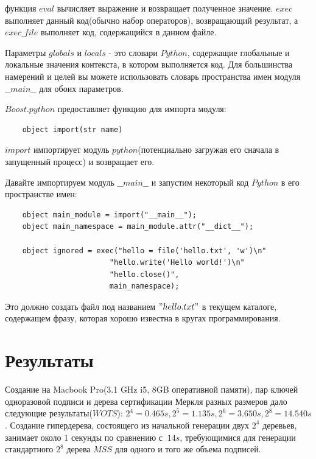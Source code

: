 \documentclass[a4paper, 14pt]{extarticle}
\begin{document}
функция $eval$ вычисляет выражение и возвращает полученное значение. $exec$ выполняет данный код(обычно набор операторов), возвращающий результат, а $exec\_file$ выполняет код, содержащийся в данном файле.

Параметры $globals$ и $locals$ - это словари $Python$, содержащие глобальные и локальные значения контекста, в котором выполняется код. Для большинства намерений и целей вы можете использовать словарь пространства имен модуля $\_\_main\_\_$ для обоих параметров.

$Boost.python$ предоставляет функцию для импорта модуля:
\begin{verbatim}
    object import(str name)
\end{verbatim}

$import$ импортирует модуль $python$(потенциально загружая его сначала в запущенный процесс) и возвращает его.

Давайте импортируем модуль $\_\_main\_\_$ и запустим некоторый код $Python$ в его пространстве имен:

\begin{verbatim}
    object main_module = import("__main__");
    object main_namespace = main_module.attr("__dict__");

    object ignored = exec("hello = file('hello.txt', 'w')\n"
                        "hello.write('Hello world!')\n"
                        "hello.close()",
                        main_namespace);
\end{verbatim}

Это должно создать файл под названием $"hello.txt"$ в текущем каталоге, содержащем фразу, которая хорошо известна в кругах программирования.

\newpage

\section{Результаты}
Создание на Macbook Pro(3.1 GHz i5, 8GB оперативной памяти), пар ключей одноразовой подписи и дерева сертификации Меркля разных размеров дало следующие результаты($WOTS$): $2^4 = 0.465s, 2^5 = 1.135s, 2^6 = 3.650s, 2^8 = 14.540s$. Создание гипердерева, состоящего из начальной генерации двух $2^4$ деревьев, занимает около 1 секунды по сравнению с $~14s$, требующимися для генерации стандартного $2^8$ дерева $MSS$ для одного и того же объема подписей. 
\end{document}
